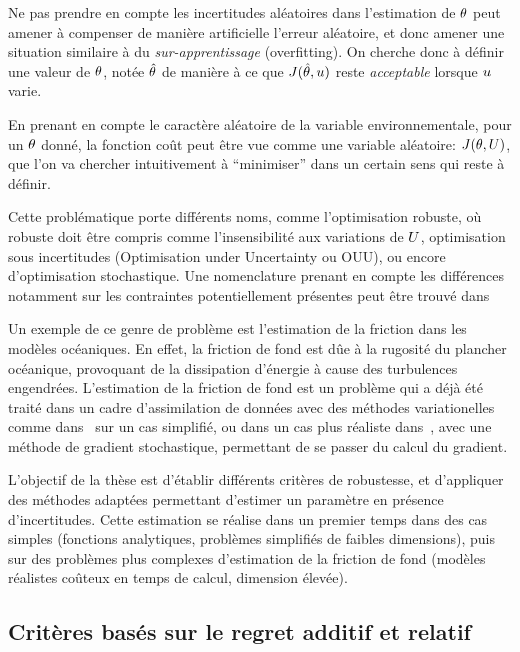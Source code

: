 \documentclass[../../Main_ManuscritThese.tex]{subfiles}
\begin{document}
Ne pas prendre en compte les incertitudes aléatoires dans l'estimation
de $\theta$ peut amener à compenser de manière artificielle l'erreur
aléatoire, et donc amener une situation similaire à du
\emph{sur-apprentissage} (overfitting). On cherche donc à définir une
valeur de $\theta$, notée $\hat{\theta}$ de manière à ce que
$J(\hat{\theta}, u)$ reste \emph{acceptable} lorsque $u$ varie.


En prenant en compte le caractère aléatoire de la variable
environnementale, pour un $\theta$ donné, la fonction coût peut être vue
comme une variable aléatoire: $J(\theta,U)$, que l'on va chercher
intuitivement à ``minimiser'' dans un certain sens qui reste à
définir.

Cette problématique porte différents noms, comme l'optimisation
robuste, où robuste doit être compris comme l'insensibilité aux
variations de $U$, optimisation sous incertitudes (Optimisation
under Uncertainty ou OUU), ou encore d'optimisation stochastique. Une
nomenclature prenant en compte les différences notamment sur les
contraintes potentiellement présentes peut être trouvé
dans~\cite{lelievre_consideration_2016}

Un exemple de ce genre de problème est l'estimation de la friction
dans les modèles océaniques.  En effet, la friction de fond est dûe à
la rugosité du plancher océanique, provoquant de la dissipation
d'énergie à cause des turbulences engendrées. L'estimation de la
friction de fond est un problème qui a déjà été traité dans un cadre
d'assimilation de données avec des méthodes variationelles comme
dans~\cite{das_estimation_1991,das_variational_1992} sur un cas
simplifié, ou dans un cas plus réaliste
dans~\cite{boutet_estimation_2015}, avec une méthode de gradient
stochastique, permettant de se passer du calcul du gradient.


L'objectif de la thèse est d'établir différents critères de
robustesse, et d'appliquer des méthodes adaptées permettant d'estimer
un paramètre en présence d'incertitudes. Cette estimation se réalise
dans un premier temps dans des cas simples (fonctions analytiques,
problèmes simplifiés de faibles dimensions), puis sur des problèmes
plus complexes d'estimation de la friction de fond (modèles réalistes
coûteux en temps de calcul, dimension élevée).

\subsection*{Critères basés sur le regret additif et relatif}
\end{document}
